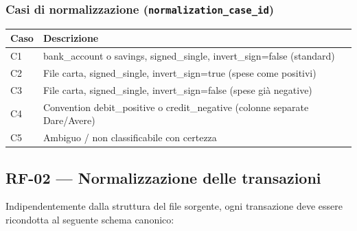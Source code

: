 \documentclass[11pt, a4paper]{article}
\begin{document}
\subsubsection{Casi di normalizzazione (\texttt{normalization\_case\_id})}
\label{sec:normcases}

\begin{center}
\begin{tabular}{@{}C{1.5cm} L{11cm}@{}}
\toprule
\textbf{Caso} & \textbf{Descrizione} \\
\midrule
C1 & bank\_account o savings, signed\_single, invert\_sign=false (standard) \\
C2 & File carta, signed\_single, invert\_sign=true (spese come positivi) \\
C3 & File carta, signed\_single, invert\_sign=false (spese già negative) \\
C4 & Convention debit\_positive o credit\_negative (colonne separate Dare/Avere) \\
C5 & Ambiguo / non classificabile con certezza \\
\bottomrule
\end{tabular}
\end{center}

\subsection{RF-02 --- Normalizzazione delle transazioni}

Indipendentemente dalla struttura del file sorgente, ogni transazione deve essere
ricondotta al seguente schema canonico:
\end{document}
